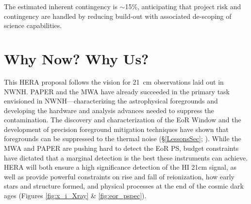 \documentclass[preprint]{aastex}
\begin{document}
%

The estimated inherent contingency is $\sim$15\%, anticipating that project 
risk and contingency are handled by reducing
build-out with associated de-scoping of science capabilities.


\section{Why Now? Why Us?} %

This HERA proposal follows the vision for 21~cm observations laid out in NWNH.
PAPER and the MWA have already succeeded in the primary task envisioned in
NWNH---characterizing the astrophysical foregrounds and developing the hardware
and analysis advances needed to suppress the contamination. The discovery and
characterization of the EoR Window and the development of precision foreground
mitigation techniques have shown that foregrounds can be suppressed to the
thermal noise (\S \ref{LessonsSec}; \citealt{parsons_et_al2013}). While the MWA
and PAPER are pushing hard to detect the EoR PS, budget constraints have
dictated that a marginal detection is the best these instruments can achieve.
HERA will both ensure a high significance detection of the HI 21cm signal, as
well as provide powerful constraints on rise and fall of reionization, how
early stars and structure formed, and physical processes at the end of the
cosmic dark ages (Figures \ref{fig:x_i_Xray} \& \ref{fig:eor_pspec}).
\end{document}
